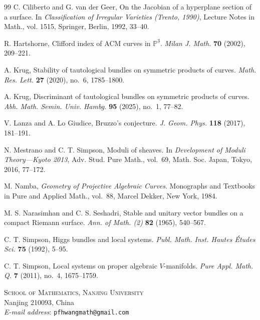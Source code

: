 \documentclass[oneside,11pt]{amsart}
\theoremstyle{definition}
\theoremstyle{remark}
\numberwithin{thm}{section}
\numberwithin{equation}{section}
\begin{document}
\begin{thebibliography}{99}
C. Ciliberto and G. van der Geer,
On the Jacobian of a hyperplane section of a surface.
In \emph{Classification of Irregular Varieties (Trento, 1990)},
Lecture Notes in Math., vol. 1515, Springer, Berlin, 1992, 33--40.

R. Hartshorne,
Clifford index of ACM curves in $\mathbb{P}^3$.
\emph{Milan J. Math.} \textbf{70} (2002), 209--221.

A. Krug,
Stability of tautological bundles on symmetric products of curves.
\emph{Math. Res. Lett.} \textbf{27} (2020), no.~6, 1785--1800.

A. Krug,
Discriminant of tautological bundles on symmetric products of curves.
\emph{Abh. Math. Semin. Univ. Hambg.} \textbf{95} (2025), no.~1, 77--82.

V. Lanza and A. Lo Giudice,
Bruzzo's conjecture.
\emph{J. Geom. Phys.} \textbf{118} (2017), 181--191.

N. Mestrano and C. T. Simpson,
Moduli of sheaves.
In \emph{Development of Moduli Theory---Kyoto 2013},
Adv. Stud. Pure Math., vol.~69, Math. Soc. Japan, Tokyo, 2016, 77--172.

M. Namba,
\emph{Geometry of Projective Algebraic Curves}.
Monographs and Textbooks in Pure and Applied Math., vol.~88,
Marcel Dekker, New York, 1984.

M. S. Narasimhan and C. S. Seshadri,
Stable and unitary vector bundles on a compact Riemann surface.
\emph{Ann. of Math. (2)} \textbf{82} (1965), 540--567.

C. T. Simpson,
Higgs bundles and local systems.
\emph{Publ. Math. Inst. Hautes \'Etudes Sci.} \textbf{75} (1992), 5--95.

C. T. Simpson,
Local systems on proper algebraic $V$-manifolds.
\emph{Pure Appl. Math. Q.} \textbf{7} (2011), no.~4, 1675--1759.

\end{thebibliography}

\bigskip

\noindent\small{\textsc{School of Mathematics, Nanjing University}\\
Nanjing 210093, China}\\
\emph{E-mail address}: \texttt{pfhwangmath@gmail.com}

\bigskip
\end{document}
